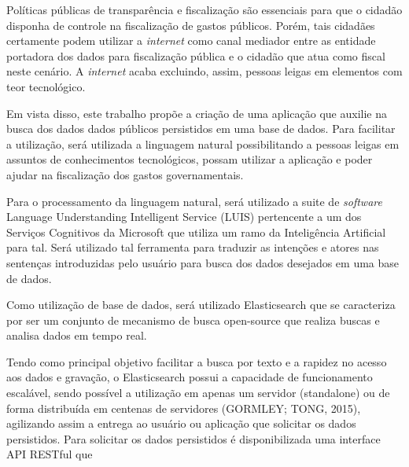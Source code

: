 Políticas públicas de transparência e fiscalização são essenciais para que o cidadão disponha de controle na fiscalização de gastos públicos. Porém, tais cidadães certamente podem utilizar a \textit{internet} como canal mediador entre as entidade portadora dos dados para fiscalização pública e o cidadão que atua como fiscal neste cenário. A \textit{internet} acaba excluindo, assim, pessoas leigas em elementos com teor tecnológico.

Em vista disso, este trabalho propõe a criação de uma aplicação que auxilie na busca dos dados dados públicos persistidos em uma base de dados. Para facilitar a utilização, será utilizada a linguagem natural possibilitando a pessoas leigas em assuntos de conhecimentos tecnológicos, possam utilizar a aplicação e poder ajudar na fiscalização dos gastos governamentais.

Para o processamento da linguagem natural, será utilizado a suite de \textit{software} Language Understanding Intelligent Service (LUIS) pertencente a um dos Serviços Cognitivos da Microsoft que utiliza um ramo da Inteligência Artificial para tal. Será utilizado tal ferramenta para traduzir as intenções e atores nas sentenças introduzidas pelo usuário para busca dos dados desejados em uma base de dados.

Como utilização de base de dados,  será utilizado Elasticsearch que se caracteriza por ser um conjunto de mecanismo de busca open-source que realiza buscas e analisa dados em tempo real.

Tendo como principal objetivo facilitar a busca por texto e a rapidez no acesso aos dados
e gravação, o Elasticsearch possui a capacidade de funcionamento escalável, sendo possível a
utilização em apenas um servidor (standalone) ou de forma distribuída em centenas de servidores
(GORMLEY; TONG, 2015), agilizando assim a entrega ao usuário ou aplicação que solicitar os
dados persistidos.
Para solicitar os dados persistidos é disponibilizada uma interface API RESTful que
